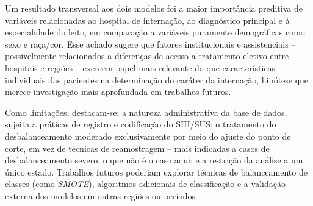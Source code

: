 \documentclass[12pt,a4paper]{article}
\begin{document}
Um resultado transversal aos dois modelos foi a maior importância preditiva de variáveis relacionadas ao hospital de internação, ao diagnóstico principal e à especialidade do leito, em comparação a variáveis puramente demográficas como sexo e raça/cor. Esse achado sugere que fatores institucionais e assistenciais -- possivelmente relacionados a diferenças de acesso a tratamento eletivo entre hospitais e regiões -- exercem papel mais relevante do que características individuais das pacientes na determinação do caráter da internação, hipótese que merece investigação mais aprofundada em trabalhos futuros.

Como limitações, destacam-se: a natureza administrativa da base de dados, sujeita a práticas de registro e codificação do SIH/SUS; o tratamento do desbalanceamento moderado exclusivamente por meio do ajuste do ponto de corte, em vez de técnicas de reamostragem -- mais indicadas a casos de desbalanceamento severo, o que não é o caso aqui; e a restrição da análise a um único estado. Trabalhos futuros poderiam explorar técnicas de balanceamento de classes (como \textit{SMOTE}), algoritmos adicionais de classificação e a validação externa dos modelos em outras regiões ou períodos.
\end{document}
